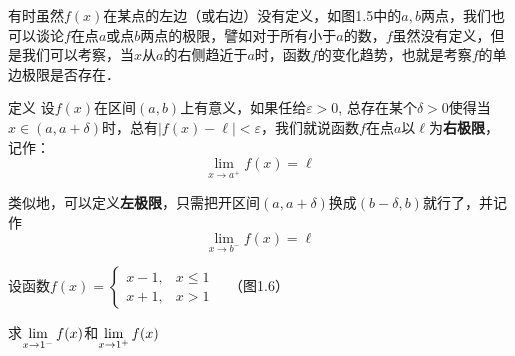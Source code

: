 有时虽然$f(x)$在某点的左边（或右边）没有定义，如图1.5中的$a,b$两点，我们也可以谈论$f$在点$a$或点$b$两点的极限，譬如对于所有小于$a$的数，$f$虽然没有定义，但是我们可以考察，当$x$从$a$的右侧趋近于$a$时，函数$f$的变化趋势，也就是考察$f$的单边极限是否存在．

\begin{figure}[htp]
    \centering
{}
    \caption{}
\end{figure}

\begin{blk}{定义}
     设$f(x)$在区间$(a,b)$上有意义，如果任给$\varepsilon>0$, 总存在某个$\delta>0$使得当$x\in (a,a+\delta)$时，总有$|f(x)-\ell|<\varepsilon$，我们就说函数$f$在点$a$以$\ell$为\textbf{右极限}，记作：
\[\lim_{x\to a^+}f(x)=\ell\]
\end{blk}

类似地，可以定义\textbf{左极限}，只需把开区间$(a,a+\delta)$换成$(b-\delta,b)$就行了，并记作
\[\lim_{x\to b^-} f(x)=\ell\]

\begin{example}
    设函数$f(x)=\begin{cases}
        x-1,&x\le 1\\
x+1,&x>1
    \end{cases}\quad $（图1.6）

    求$\displaystyle\lim_{x\to 1^-}f(x)$和$\displaystyle\lim_{x\to 1^+}f(x)$
\end{example}

